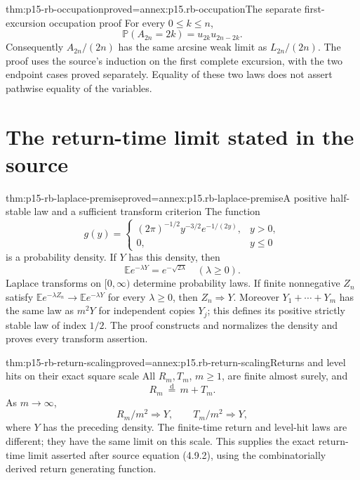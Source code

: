 \begin{hbtheorem}{thm:p15-rb-occupation}{proved=annex:p15.rb-occupation}{The separate first-excursion occupation proof}
For every \(0\leq k\leq n\),
\[
                  \mathbb P(A_{2n}=2k)=u_{2k}u_{2n-2k}.
 \]
Consequently \(A_{2n}/(2n)\) has the same arcsine weak limit
as \(L_{2n}/(2n)\). The proof uses the source's induction on
the first complete excursion, with the two endpoint cases
proved separately. Equality of these two laws does not assert
pathwise equality of the variables.
\end{hbtheorem}

\section{The return-time limit stated in the source}
\label{sec:p15-rb-half-stable}

\begin{hbtheorem}{thm:p15-rb-laplace-premise}{proved=annex:p15.rb-laplace-premise}{A positive half-stable law and a sufficient transform criterion}
The function
\[
 g(y)=
 \begin{cases}
  (2\pi)^{-1/2}y^{-3/2}e^{-1/(2y)},&y>0,\\
  0,&y\leq0
 \end{cases}
 \]
is a probability density. If \(Y\) has this density, then
\[
                    \mathbb Ee^{-\lambda Y}=e^{-\sqrt{2\lambda}}
                                      \quad(\lambda\geq0).
 \]
Laplace transforms on \([0,\infty)\) determine probability laws.
If finite nonnegative \(Z_n\) satisfy
\(\mathbb Ee^{-\lambda Z_n}\to\mathbb Ee^{-\lambda Y}\)
for every \(\lambda\geq0\), then \(Z_n\Rightarrow Y\).
Moreover \(Y_1+\cdots+Y_m\) has the same law as \(m^2Y\)
for independent copies \(Y_j\); this defines its positive
strictly stable law of index \(1/2\).
The proof constructs and normalizes the density and proves
every transform assertion.
\end{hbtheorem}

\begin{hbtheorem}{thm:p15-rb-return-scaling}{proved=annex:p15.rb-return-scaling}{Returns and level hits on their exact square scale}
All \(R_m,T_m\), \(m\geq1\), are finite almost surely, and
\[
                  R_m\ \stackrel{\mathrm d}=\,m+T_m.
 \]
As \(m\to\infty\),
\[
                      R_m/m^2\Rightarrow Y,\qquad
                      T_m/m^2\Rightarrow Y,
 \]
where \(Y\) has the preceding density.
The finite-time return and level-hit laws are different; they
have the same limit on this scale.
This supplies the exact return-time limit asserted after
source equation (4.9.2), using the combinatorially derived
return generating function.
\end{hbtheorem}

